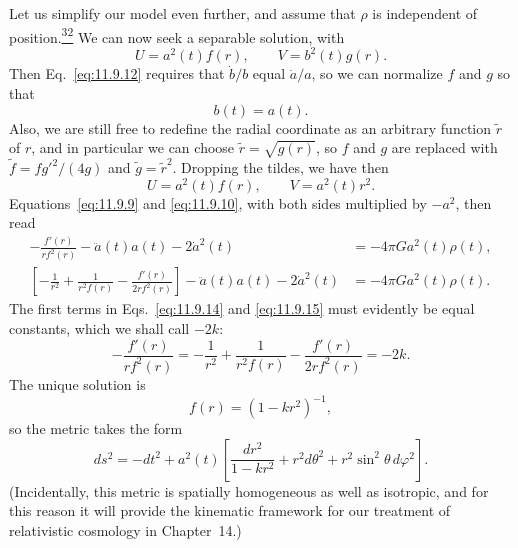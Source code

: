 Let us simplify our model even further, and assume that \(\rho\) is
independent of position.\hyperref[ch11-ref-32]{\textsuperscript{32}} We can
now seek a separable solution, with
\[
  U=a^2(t)f(r),\qquad V=b^2(t)g(r).
\]
Then Eq.~\eqref{eq:11.9.12} requires that \(\dot b/b\) equal \(\dot a/a\),
so we can normalize \(f\) and \(g\) so that
\[
  b(t)=a(t).
\]
Also, we are still free to redefine the radial coordinate as an arbitrary
function \(\tilde r\) of \(r\), and in particular we can choose
\(\tilde r=\sqrt{g(r)}\), so \(f\) and \(g\) are replaced with
\(\tilde f=fg'^2/(4g)\) and \(\tilde g=\tilde r^2\). Dropping the tildes,
we have then
\begin{equation}
  U=a^2(t)f(r),\qquad V=a^2(t)r^2.
  \tag{11.9.13}\label{eq:11.9.13}
\end{equation}
Equations~\eqref{eq:11.9.9} and \eqref{eq:11.9.10}, with both sides
multiplied by \(-a^2\), then read
\begin{align}
  -\frac{f'(r)}{rf^2(r)}
  -\ddot a(t)a(t)-2\dot a^2(t)
  &=-4\pi G a^2(t)\rho(t),
  \tag{11.9.14}\label{eq:11.9.14}\\
  \left[
    -\frac1{r^2}
    +\frac1{r^2f(r)}
    -\frac{f'(r)}{2rf^2(r)}
  \right]
  -\ddot a(t)a(t)-2\dot a^2(t)
  &=-4\pi G a^2(t)\rho(t).
  \tag{11.9.15}\label{eq:11.9.15}
\end{align}
The first terms in Eqs.~\eqref{eq:11.9.14} and \eqref{eq:11.9.15} must
evidently be equal constants, which we shall call \(-2k\):
\[
  -\frac{f'(r)}{rf^2(r)}
  =
  -\frac1{r^2}+\frac1{r^2f(r)}
  -\frac{f'(r)}{2rf^2(r)}
  =-2k.
\]
The unique solution is
\[
  f(r)=(1-kr^2)^{-1},
\]
so the metric takes the form
\begin{equation}
  ds^2
  =
  -dt^2+a^2(t)
  \left[
    \frac{dr^2}{1-kr^2}
    +r^2d\theta^2+r^2\sin^2\theta\,d\varphi^2
  \right].
  \tag{11.9.16}\label{eq:11.9.16}
\end{equation}
(Incidentally, this metric is spatially homogeneous as well as isotropic, and
for this reason it will provide the kinematic framework for our treatment of
relativistic cosmology in Chapter~14.)

